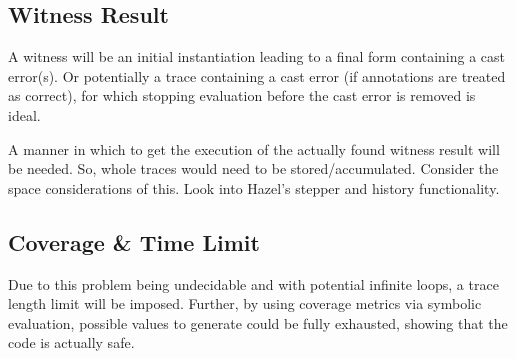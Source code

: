 \subsection{Witness Result}
A witness will be an initial instantiation leading to a  final form containing a cast error(s). Or potentially a trace containing a cast error (if annotations are treated as correct), for which stopping evaluation before the cast error is removed is ideal. 
\par
A manner in which to get the execution of the actually found witness result will be needed. So, whole traces would need to be stored/accumulated. Consider the space considerations of this. Look into Hazel's stepper and history functionality.

\subsection{Coverage \& Time Limit}
Due to this problem being undecidable and with potential infinite loops, a trace length limit will be imposed. Further, by using coverage metrics via symbolic evaluation, possible values to generate could be fully exhausted, showing that the code is actually safe.

